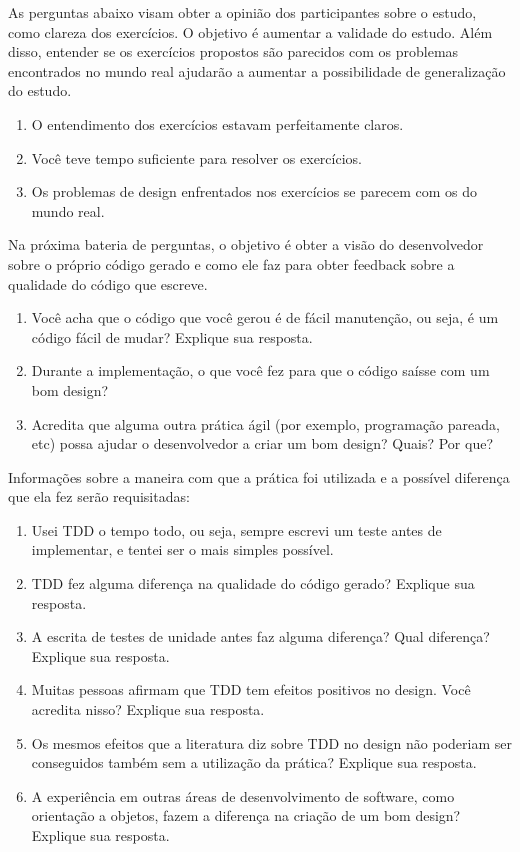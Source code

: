As perguntas abaixo visam obter a opinião dos participantes sobre o estudo, como clareza dos
exercícios. O objetivo é aumentar a validade do estudo.
Além disso, entender se os exercícios propostos são parecidos com os problemas encontrados no mundo
real ajudarão a aumentar a possibilidade de generalização do estudo. 

\begin{enumerate}
	\item O entendimento dos exercícios estavam perfeitamente claros.
	\item Você teve tempo suficiente para resolver os exercícios.
	\item Os problemas de design enfrentados nos exercícios se parecem com os do mundo real.
\end{enumerate}

Na próxima bateria de perguntas, o objetivo é obter a visão do desenvolvedor sobre o próprio código gerado e como ele
faz para obter feedback sobre a qualidade do código que escreve.

\begin{enumerate}
	\item Você acha que o código que você gerou é de fácil manutenção, ou seja, é um código fácil de mudar? Explique sua resposta.
	\item Durante a implementação, o que você fez para que o código saísse com um bom design?
	\item Acredita que alguma outra prática ágil (por exemplo, programação pareada, etc) possa ajudar o desenvolvedor a criar um bom design? Quais? Por que?
\end{enumerate}

Informações sobre a maneira com que a prática foi utilizada e a possível
diferença que ela fez serão requisitadas:

\begin{enumerate}
	\item Usei TDD o tempo todo, ou seja, sempre escrevi um teste antes de implementar, e tentei ser o mais simples possível.
	\item TDD fez alguma diferença na qualidade do código gerado? Explique sua resposta.
	\item A escrita de testes de unidade antes faz alguma diferença? Qual diferença? Explique sua resposta.
	\item Muitas pessoas afirmam que TDD tem efeitos positivos no design. Você acredita nisso? Explique sua resposta.
	\item Os mesmos efeitos que a literatura diz sobre TDD no design não poderiam ser conseguidos também sem a utilização da prática? Explique sua resposta.
	\item A experiência em outras áreas de desenvolvimento de software, como orientação a objetos, fazem a diferença na criação de um bom design? Explique sua resposta.
\end{enumerate}


